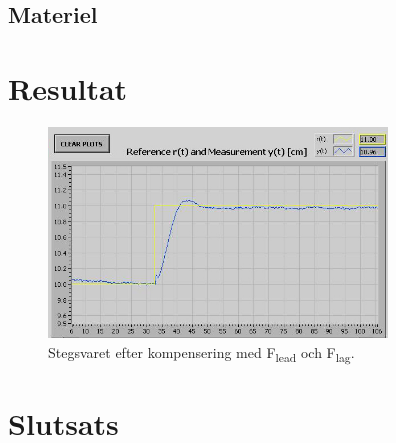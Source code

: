 \documentclass{article}
\begin{document}
\subsection{Materiel}

\section{Resultat}

\begin{figure}[ht!]
\centering
\includegraphics[width=90mm]{Test1_cut.jpg}
\caption{Stegsvaret efter kompensering med F\textsubscript{lead} och F\textsubscript{lag}.}
\label{overflow}
\end{figure}


\section{Slutsats}
\end{document}
